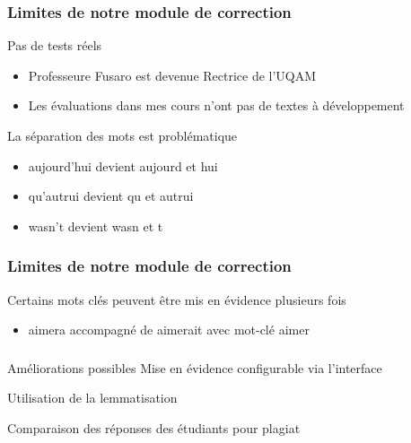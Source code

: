 \documentclass{beamer}
\begin{document}
  \begin{frame}
    \frametitle{Limites de notre module de correction}
    \begin{block}{Pas de tests réels}
      \begin{itemize}
        \item Professeure Fusaro est devenue Rectrice de l'UQAM
        \item Les \'evaluations dans mes cours n'ont pas de textes \`a d\'eveloppement
      \end{itemize}
    \end{block}
  
    \vfill
  
    \begin{block}{La s\'eparation des mots est probl\'ematique}
      \begin{itemize}
        \item \og aujourd'hui \fg{} devient \og aujourd \fg{} et \og hui \fg{} 
        \item \og qu'autrui \fg{} devient \og qu \fg{} et \og autrui \fg{} 
        \item \og wasn't \fg{} devient \og wasn \fg{} et \og t \fg{} 
      \end{itemize}
    \end{block}
    \vfill
  \end{frame}
  
  \begin{frame}
    \frametitle{Limites de notre module de correction}
    \begin{block}{Certains mots cl\'es peuvent \^etre mis en \'evidence plusieurs fois}
      \begin{itemize}
        \item \og aimera \fg{} accompagn\'e de \og aimerait \fg{} avec mot-cl\'e \og aimer \fg{}
      \end{itemize}
    \end{block}
  \end{frame}
  
  \begin{frame}
    \frametitle{\insertsection}
    \begin{block}{Am\'eliorations possibles}
      Mise en \'evidence configurable via l'interface
  
      Utilisation de la lemmatisation
  
      Comparaison des r\'eponses des \'etudiants pour plagiat
    \end{block}
  \end{frame}
  
\end{document}
